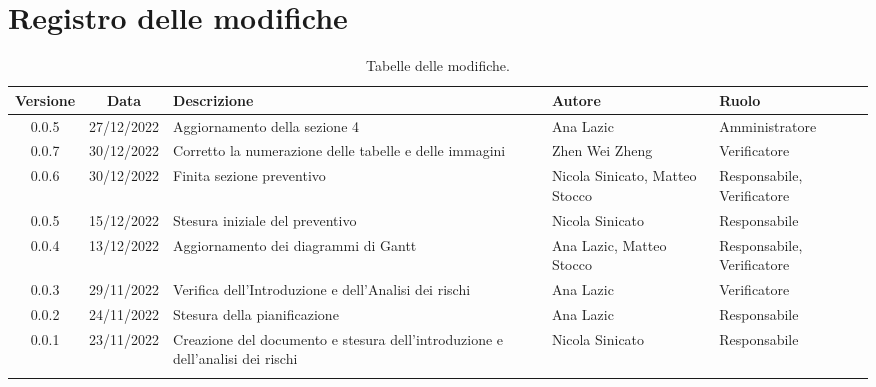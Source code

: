 \section*{Registro delle modifiche}
\begin{table}[H]
	\centering
	\renewcommand\tabularxcolumn[1]{>{\Centering}m{#1}}
	\begin{tabularx}{\textwidth}{| c | c | X | X | X |} 
	\hline
	\textbf{Versione} & \textbf{Data} & \textbf{Descrizione} & \textbf{Autore} & \textbf{Ruolo}\\
    \hline
	0.0.5 & 27/12/2022 & Aggiornamento della sezione 4 & Ana Lazic & Amministratore\\
	\hline
	0.0.7 & 30/12/2022 & Corretto la numerazione delle tabelle e delle immagini & Zhen Wei Zheng & Verificatore\\
	\hline
	0.0.6 & 30/12/2022 & Finita sezione preventivo & Nicola Sinicato, Matteo Stocco & Responsabile, Verificatore\\
	\hline
	0.0.5 & 15/12/2022 & Stesura iniziale del preventivo & Nicola Sinicato & Responsabile\\
	\hline
	0.0.4 & 13/12/2022 & Aggiornamento dei diagrammi di Gantt & Ana Lazic, Matteo Stocco & Responsabile, Verificatore\\
	\hline
	0.0.3 & 29/11/2022 & Verifica dell'Introduzione e dell'Analisi dei rischi & Ana Lazic & Verificatore\\
	\hline
	0.0.2 & 24/11/2022 & Stesura della pianificazione & Ana Lazic & Responsabile\\
	\hline
	0.0.1 & 23/11/2022 & Creazione del documento e stesura dell'introduzione e dell'analisi dei rischi & Nicola Sinicato & Responsabile\\
 	\hline
\caption{Tabelle delle modifiche.}
	\end{tabularx}
	\vspace{10pt}
\end{table}
